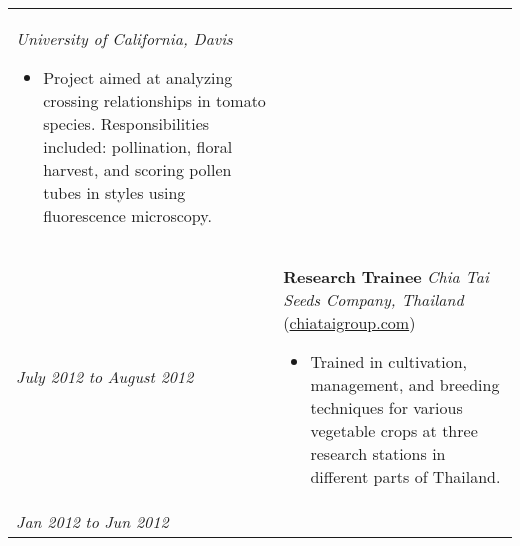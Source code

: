 ﻿\documentclass[a4paper]{article}
\begin{document}
\begin{tabular}{p{3cm} p{14cm}}
\textit{University of California, Davis}
\begin{itemize}[noitemsep,topsep=0pt]
  \item Project aimed at analyzing crossing relationships in tomato species. Responsibilities included: pollination, floral harvest, and scoring pollen tubes in styles using fluorescence microscopy.
\end{itemize}
%
\\
%
\vspace{0pt} 
\textit{July 2012}\newline
\textit{to}\newline
\textit{August 2012}\newline
&
\vspace{0pt}
\textbf{Research Trainee}\newline
\textit{Chia Tai Seeds Company, Thailand} (\href{http://www.chiataigroup.com/AboutUs.aspx}{chiataigroup.com})
\begin{itemize}[noitemsep,topsep=0pt]
  \item Trained in cultivation, management, and breeding techniques for various vegetable crops at three research stations in different parts of Thailand.
\end{itemize}
%
\\
%
\vspace{0pt} 
\textit{Jan 2012}\newline
\textit{to}\newline
\textit{Jun 2012}\newline
&
\vspace{0pt}


\end{tabular}
\end{document}
